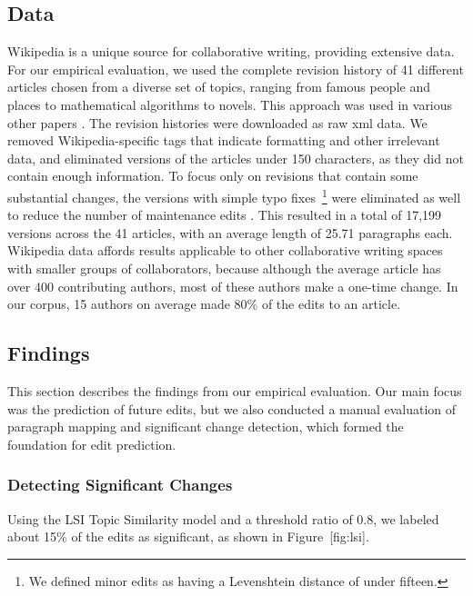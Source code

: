 \subsection{Data}\label{data}

Wikipedia is a unique source for collaborative writing, providing
extensive data. For our empirical evaluation, we used the complete
revision history of 41 different articles chosen from a diverse set of
topics, ranging from famous people and places to mathematical algorithms
to novels. This approach was used in various other papers
\cite{wohner2009assessing, fong2010did}. The revision histories were
downloaded as raw xml data. We removed Wikipedia-specific tags that
indicate formatting and other irrelevant data, and eliminated versions
of the articles under 150 characters, as they did not contain enough
information. To focus only on revisions that contain some substantial
changes, the versions with simple typo fixes~\footnote{We defined minor
  edits as having a Levenshtein distance of under fifteen.} were
eliminated as well to reduce the number of maintenance edits
\cite{kittur2007he}. This resulted in a total of 17,199 versions across
the 41 articles, with an average length of 25.71 paragraphs each.
Wikipedia data affords results applicable to other collaborative writing
spaces with smaller groups of collaborators, because although the
average article has over 400 contributing authors, most of these authors
make a one-time change. In our corpus, 15 authors on average made 80\%
of the edits to an article.

\subsection{Findings}\label{findings}

This section describes the findings from our empirical evaluation. Our
main focus was the prediction of future edits, but we also conducted a
manual evaluation of paragraph mapping and significant change detection,
which formed the foundation for edit prediction.

\subsubsection{Detecting Significant
Changes}\label{detecting-significant-changes}

Using the LSI Topic Similarity model and a threshold ratio of 0.8, we
labeled about 15\% of the edits as significant, as shown in
Figure~{[}fig:lsi{]}.


